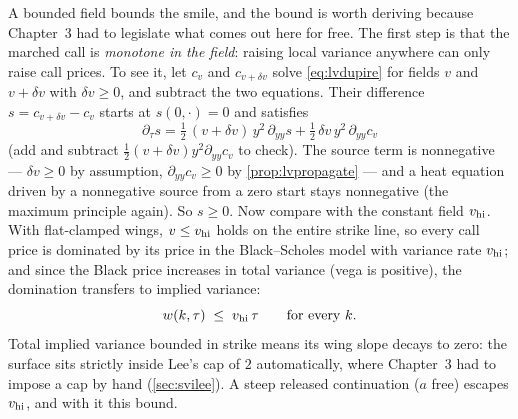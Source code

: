 \begin{remark}
\label{rem:lvlee}
A bounded field bounds the smile, and the bound is worth deriving
because Chapter~3 had to legislate what comes out here for free.  The
first step is that the marched call is \emph{monotone in the field}:
raising local variance anywhere can only raise call prices.  To see
it, let $c_{v}$ and $c_{v+\delta v}$ solve \eqref{eq:lvdupire} for
fields $v$ and $v+\delta v$ with $\delta v\ge0$, and subtract the two
equations.  Their difference $s=c_{v+\delta v}-c_{v}$ starts at
$s(0,\cdot)=0$ and satisfies
\[
\partial_\tau s
=\tfrac12\,(v+\delta v)\,y^{2}\,\partial_{yy}s
+\tfrac12\,\delta v\,y^{2}\,\partial_{yy}c_{v}
\]
(add and subtract $\tfrac12(v+\delta v)y^{2}\partial_{yy}c_{v}$ to
check).  The source term is nonnegative --- $\delta v\ge0$ by
assumption, $\partial_{yy}c_{v}\ge0$ by \cref{prop:lvpropagate} ---
and a heat equation driven by a nonnegative source from a zero start
stays nonnegative (the maximum principle again).  So $s\ge0$.  Now
compare with the constant field $v_{\rm hi}$.  With flat-clamped
wings, $v\le v_{\rm hi}$ holds on the entire strike line, so every
call price is dominated by its price in the Black--Scholes model with
variance rate $v_{\rm hi}$; and since the Black price increases in
total variance (vega is positive), the domination transfers to implied
variance:
\[
w(k,\tau)\;\le\;v_{\rm hi}\,\tau\qquad\text{for every }k .
\]
Total implied variance bounded in strike means its wing slope decays
to zero: the surface sits strictly inside Lee's cap of $2$
automatically, where Chapter~3 had to impose a cap by hand
(\cref{sec:svilee}).  A steep released continuation ($a$ free) escapes
$v_{\rm hi}$, and with it this bound.
\end{remark}
